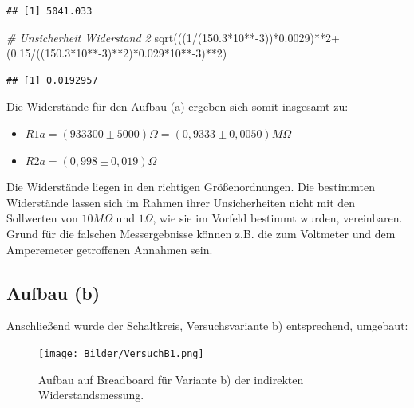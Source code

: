 \documentclass[
  9pt,
]{article}
\newenvironment{Shaded}{\begin{snugshade}}{\end{snugshade}}
\newcommand{\CommentTok}[1]{\textcolor[rgb]{0.56,0.35,0.01}{\textit{#1}}}
\newcommand{\DecValTok}[1]{\textcolor[rgb]{0.00,0.00,0.81}{#1}}
\newcommand{\FloatTok}[1]{\textcolor[rgb]{0.00,0.00,0.81}{#1}}
\newcommand{\FunctionTok}[1]{\textcolor[rgb]{0.00,0.00,0.00}{#1}}
\newcommand{\NormalTok}[1]{#1}
\newcommand{\SpecialCharTok}[1]{\textcolor[rgb]{0.00,0.00,0.00}{#1}}
\begin{document}
\begin{verbatim}
## [1] 5041.033
\end{verbatim}

\begin{Shaded}
\begin{Highlighting}[]
\CommentTok{\# Unsicherheit Widerstand 2}
\FunctionTok{sqrt}\NormalTok{(((}\DecValTok{1}\SpecialCharTok{/}\NormalTok{(}\FloatTok{150.3}\SpecialCharTok{*}\DecValTok{10}\SpecialCharTok{**{-}}\DecValTok{3}\NormalTok{))}\SpecialCharTok{*}\FloatTok{0.0029}\NormalTok{)}\SpecialCharTok{**}\DecValTok{2}\SpecialCharTok{+}\NormalTok{(}\FloatTok{0.15}\SpecialCharTok{/}\NormalTok{((}\FloatTok{150.3}\SpecialCharTok{*}\DecValTok{10}\SpecialCharTok{**{-}}\DecValTok{3}\NormalTok{)}\SpecialCharTok{**}\DecValTok{2}\NormalTok{)}\SpecialCharTok{*}\FloatTok{0.029}\SpecialCharTok{*}\DecValTok{10}\SpecialCharTok{**{-}}\DecValTok{3}\NormalTok{)}\SpecialCharTok{**}\DecValTok{2}\NormalTok{)}
\end{Highlighting}
\end{Shaded}

\begin{verbatim}
## [1] 0.0192957
\end{verbatim}

Die Widerstände für den Aufbau (a) ergeben sich somit insgesamt zu:

\begin{itemize}
\item $R1a = (933300 \pm 5000)\Omega = (0,9333 \pm 0,0050)M\Omega$
\item $R2a = (0,998 \pm 0,019) \Omega$
\end{itemize}

Die Widerstände liegen in den richtigen Größenordnungen. Die bestimmten
Widerstände lassen sich im Rahmen ihrer Unsicherheiten nicht mit den
Sollwerten von \(10M\Omega\) und \(1\Omega\), wie sie im Vorfeld
bestimmt wurden, vereinbaren. Grund für die falschen Messergebnisse
können z.B. die zum Voltmeter und dem Amperemeter getroffenen Annahmen
sein.

\hypertarget{aufbau-b}{%
\subsection{Aufbau (b)}\label{aufbau-b}}

Anschließend wurde der Schaltkreis, Versuchsvariante b) entsprechend,
umgebaut:

\begin{figure}
\centering
\texttt{[image: Bilder/VersuchB1.png]}
\caption{Aufbau auf Breadboard für Variante b) der indirekten
Widerstandsmessung.}
\end{figure}
\end{document}

